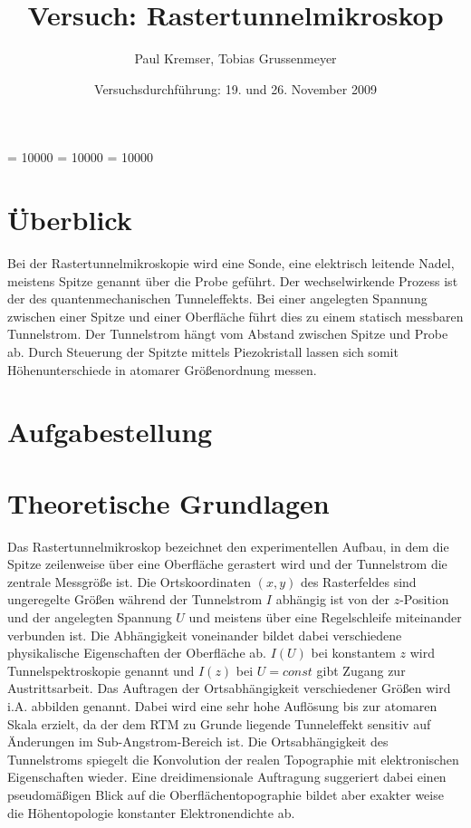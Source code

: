 \documentclass[12pt]{article}
\newcommand{\changefont}[3]{
\fontfamily{#1} \fontseries{#2} \fontshape{#3} \selectfont}
\begin{document}
\clubpenalty = 10000
\widowpenalty = 10000 
\displaywidowpenalty = 10000

\onehalfspacing
\changefont{ptm}{m}{n} 

\begin{titlepage}
\author{Paul Kremser, Tobias Grussenmeyer}
\title{Versuch: Rastertunnelmikroskop}
\date{Versuchsdurchführung: 19. und 26. November 2009} 
\maketitle
\thispagestyle{empty}
\end{titlepage}


\tableofcontents
\thispagestyle{empty}
\newpage
{}
\section{Überblick}
Bei der Rastertunnelmikroskopie wird eine Sonde, eine elektrisch leitende Nadel, meistens Spitze genannt über die Probe geführt. Der wechselwirkende Prozess ist der des quantenmechanischen Tunneleffekts. Bei einer angelegten Spannung zwischen einer Spitze und einer Oberfläche führt dies zu einem statisch messbaren Tunnelstrom. Der Tunnelstrom hängt vom Abstand zwischen Spitze und Probe ab. Durch Steuerung der Spitzte mittels Piezokristall lassen sich somit Höhenunterschiede in atomarer Größenordnung messen.

\section{Aufgabestellung}

\section{Theoretische Grundlagen}
Das Rastertunnelmikroskop bezeichnet den experimentellen Aufbau, in dem die Spitze zeilenweise über eine Oberfläche gerastert wird und der Tunnelstrom die zentrale Messgröße ist. Die Ortskoordinaten $(x,y)$ des Rasterfeldes sind ungeregelte Größen während der Tunnelstrom $I$ abhängig ist von der $z$-Position und der angelegten Spannung $U$ und meistens über eine Regelschleife miteinander verbunden ist. Die Abhängigkeit voneinander bildet dabei verschiedene physikalische Eigenschaften der Oberfläche ab. $I(U)$ bei konstantem $z$ wird Tunnelspektroskopie genannt und $I(z)$ bei $U = const$ gibt Zugang zur Austrittsarbeit. Das Auftragen der Ortsabhängigkeit verschiedener Größen wird i.A. abbilden genannt. Dabei wird eine sehr hohe Auflösung bis zur atomaren Skala erzielt, da der dem RTM zu Grunde liegende Tunneleffekt sensitiv auf Änderungen im Sub-Angstrom-Bereich ist. Die Ortsabhängigkeit des Tunnelstroms spiegelt die Konvolution der realen Topographie mit elektronischen Eigenschaften wieder. Eine dreidimensionale Auftragung suggeriert dabei einen pseudomäßigen Blick auf die Oberflächentopographie bildet aber exakter weise die Höhentopologie konstanter Elektronendichte ab.
\end{document}
